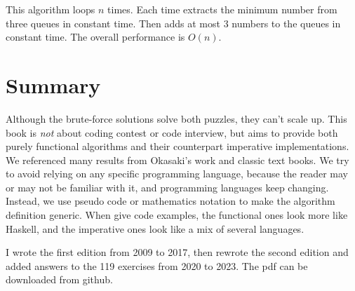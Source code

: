 \documentclass[b5paper]{article}
\begin{document}
This algorithm loops $n$ times. Each time extracts the minimum number from three queues in constant time. Then adds at most 3 numbers to the queues in constant time. The overall performance is $O(n)$.

\section*{Summary}
Although the brute-force solutions solve both puzzles, they can't scale up. This book is {\em not} about coding contest or code interview, but aims to provide both purely functional algorithms and their counterpart imperative implementations. We referenced many results from Okasaki's work\cite{okasaki-book} and classic text books\cite{CLRS}. We try to avoid relying on any specific programming language, because the reader may or may not be familiar with it, and programming languages keep changing. Instead, we use pseudo code or mathematics notation to make the algorithm definition generic. When give code examples, the functional ones look more like Haskell, and the imperative ones look like a mix of several languages.

I wrote the first edition from 2009 to 2017, then rewrote the second edition and added answers to the 119 exercises from 2020 to 2023. The pdf can be downloaded from github.

\begin{Exercise}\label{ex:preface}


\end{Exercise}
\end{document}
